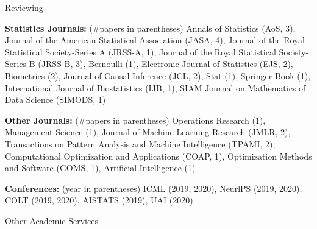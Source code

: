\documentclass{article}
\begin{document}






\vspace{5mm}
\begin{large}
\noindent Reviewing
\end{large}

\vspace{2mm}
\noindent \textbf{Statistics Journals: }(\#papers in parentheses) Annals of Statistics (AoS, 3), Journal of the American Statistical Association (JASA, 4), Journal of the Royal Statistical Society-Series A (JRSS-A, 1), Journal of the Royal Statistical Society-Series B (JRSS-B, 3), Bernoulli (1), Electronic Journal of Statistics (EJS, 2), Biometrics (2), Journal of Causal Inference (JCL, 2), Stat (1), Springer Book (1), International Journal of Biostatistics (IJB, 1), SIAM Journal on Mathematics of Data Science (SIMODS, 1)

\vspace{2mm}
\noindent \textbf{Other Journals: }(\#papers in parentheses) Operations Research (1), Management Science (1), Journal of Machine Learning Research (JMLR, 2), Transactions on Pattern Analysis and Machine Intelligence (TPAMI, 2), Computational Optimization and Applications (COAP, 1), Optimization Methods and Software (GOMS, 1), Artificial Intelligence (1)

\vspace{2mm}
\noindent \textbf{Conferences: }(year in parentheses) ICML (2019, 2020), NeurlPS (2019, 2020), COLT (2019, 2020), AISTATS (2019), UAI (2020)

\vspace{5mm}
\begin{large}
\noindent Other Academic Services
\end{large}
\end{document}
